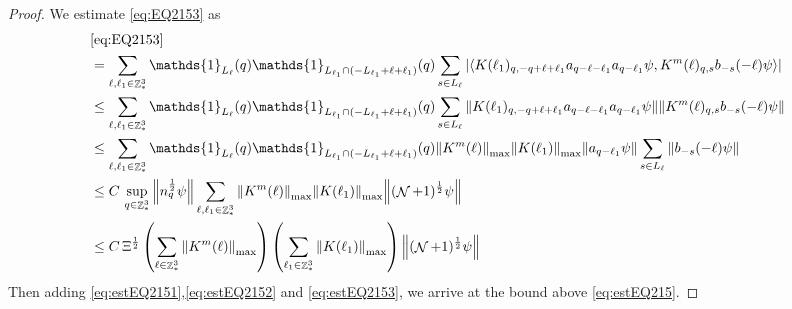 \documentclass[sn-mathphys, Numbered ,a4paper]{sn-jnl}%
\DeclareMathOperator{\Z}{\mathbb{Z}}
\DeclareMathOperator{\NN}{\mathcal{N}}
\newcommand{\half}{\frac{1}{2}}
\newcommand{\eva}[1]{\left\langle #1 \right\rangle}
\theoremstyle{plain}
\theoremstyle{definition}
\theoremstyle{remark}
\theoremstyle{plain}
\theoremstyle{definition}
\theoremstyle{remark}
\begin{document}
\begin{proof}
We estimate \eqref{eq:EQ2153} as 
\begin{align}
	&\eqref{eq:EQ2153}\nonumber\\
	&= \sum\limits_{\ell, \ell_1\in \Z^3_*} \mathds{1}_{L_{\ell}}(q) \mathds{1}_{L_{\ell_1}\cap (-L_{\ell_1}+\ell+\ell_1)}(q) \sum\limits_{ s \in L_{\ell}} \abs{\eva{K(\ell_1)_{q,-q+\ell+\ell_1} a_{q-\ell-\ell_1}  a_{q-\ell_1} \psi, K^m(\ell)_{q,s}  b_{-s}(-\ell) \psi }}\nonumber\\
	&\leq  \sum\limits_{\ell, \ell_1\in \Z^3_*} \mathds{1}_{L_{\ell}}(q) \mathds{1}_{L_{\ell_1}\cap (-L_{\ell_1}+\ell+\ell_1)}(q) \sum\limits_{ s \in L_{\ell}} \norm{K(\ell_1)_{q,-q+\ell+\ell_1} a_{q-\ell-\ell_1}  a_{q-\ell_1} \psi} \norm{ K^m(\ell)_{q,s}  b_{-s}(-\ell) \psi }\nonumber\\
	&\leq  \sum\limits_{\ell, \ell_1\in \Z^3_*} \mathds{1}_{L_{\ell}}(q) \mathds{1}_{L_{\ell_1}\cap (-L_{\ell_1}+\ell+\ell_1)}(q) \norm{K^m(\ell)}_{\mathrm{max}} \norm{K(\ell_1)}_{\mathrm{max}} \norm{  a_{q-\ell_1} \psi} \sum\limits_{ s \in L_{\ell}} \norm{ b_{-s}(-\ell) \psi }\nonumber\\
	&\leq C\,\sup\limits_{q \in \Z^3_*} \norm{ n_{q}^\half \psi} \sum\limits_{\ell, \ell_1\in \Z^3_*} \norm{K^m(\ell)}_{\mathrm{max}} \norm{K(\ell_1)}_{\mathrm{max}} \norm{(\NN+1)^\half\psi}\nonumber\\
	&\leq  C\, \Xi^\half \left(\sum\limits_{\ell \in \Z^3_*} \norm{K^m(\ell)}_{\mathrm{max}}\right)\left( \sum\limits_{\ell_1\in \Z^3_*} \norm{ K(\ell_1)}_{\mathrm{max}} \right) \norm{(\NN+1)^\half\psi}\label{eq:estEQ2153}
\end{align}
Then adding \eqref{eq:estEQ2151},\eqref{eq:estEQ2152} and \eqref{eq:estEQ2153}, we arrive at the bound above \eqref{eq:estEQ215}.
\end{proof}
\end{document}
